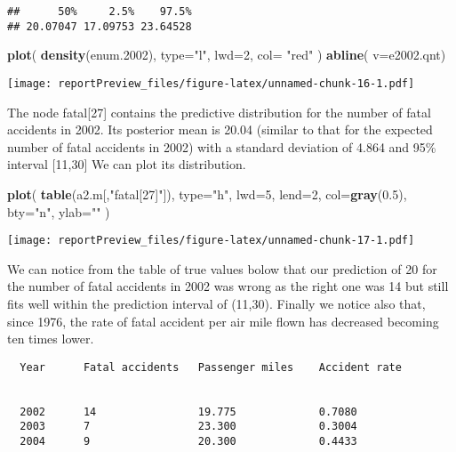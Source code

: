 \documentclass[]{article}
\newenvironment{Shaded}{\begin{snugshade}}{\end{snugshade}}
\newcommand{\KeywordTok}[1]{\textcolor[rgb]{0.13,0.29,0.53}{\textbf{#1}}}
\newcommand{\DataTypeTok}[1]{\textcolor[rgb]{0.13,0.29,0.53}{#1}}
\newcommand{\DecValTok}[1]{\textcolor[rgb]{0.00,0.00,0.81}{#1}}
\newcommand{\FloatTok}[1]{\textcolor[rgb]{0.00,0.00,0.81}{#1}}
\newcommand{\StringTok}[1]{\textcolor[rgb]{0.31,0.60,0.02}{#1}}
\newcommand{\NormalTok}[1]{#1}
\begin{document}
\begin{verbatim}
##      50%     2.5%    97.5% 
## 20.07047 17.09753 23.64528
\end{verbatim}

\begin{Shaded}
\begin{Highlighting}[]
\KeywordTok{plot}\NormalTok{( }\KeywordTok{density}\NormalTok{(enum.}\DecValTok{2002}\NormalTok{), }\DataTypeTok{type=}\StringTok{"l"}\NormalTok{, }\DataTypeTok{lwd=}\DecValTok{2}\NormalTok{, }\DataTypeTok{col=} \StringTok{"red"}\NormalTok{ )}
\KeywordTok{abline}\NormalTok{( }\DataTypeTok{v=}\NormalTok{e2002.qnt)}
\end{Highlighting}
\end{Shaded}

\texttt{[image: reportPreview\_files/figure-latex/unnamed-chunk-16-1.pdf]}

The node fatal{[}27{]} contains the predictive distribution for the
number of fatal accidents in 2002. Its posterior mean is 20.04 (similar
to that for the expected number of fatal accidents in 2002) with a
standard deviation of 4.864 and 95\% interval {[}11,30{]} We can plot
its distribution.

\begin{Shaded}
\begin{Highlighting}[]
\KeywordTok{plot}\NormalTok{( }\KeywordTok{table}\NormalTok{(a2.m[,}\StringTok{"fatal[27]"}\NormalTok{]), }\DataTypeTok{type=}\StringTok{"h"}\NormalTok{, }\DataTypeTok{lwd=}\DecValTok{5}\NormalTok{, }\DataTypeTok{lend=}\DecValTok{2}\NormalTok{, }\DataTypeTok{col=}\KeywordTok{gray}\NormalTok{(}\FloatTok{0.5}\NormalTok{), }\DataTypeTok{bty=}\StringTok{"n"}\NormalTok{, }\DataTypeTok{ylab=}\StringTok{""}\NormalTok{ )}
\end{Highlighting}
\end{Shaded}

\texttt{[image: reportPreview\_files/figure-latex/unnamed-chunk-17-1.pdf]}

We can notice from the table of true values bolow that our prediction of
20 for the number of fatal accidents in 2002 was wrong as the right one
was 14 but still fits well within the prediction interval of (11,30).
Finally we notice also that, since 1976, the rate of fatal accident per
air mile flown has decreased becoming ten times lower.

\begin{verbatim}
  Year      Fatal accidents   Passenger miles    Accident rate
               

  2002      14                19.775             0.7080
  2003      7                 23.300             0.3004
  2004      9                 20.300             0.4433
\end{verbatim}
\end{document}
